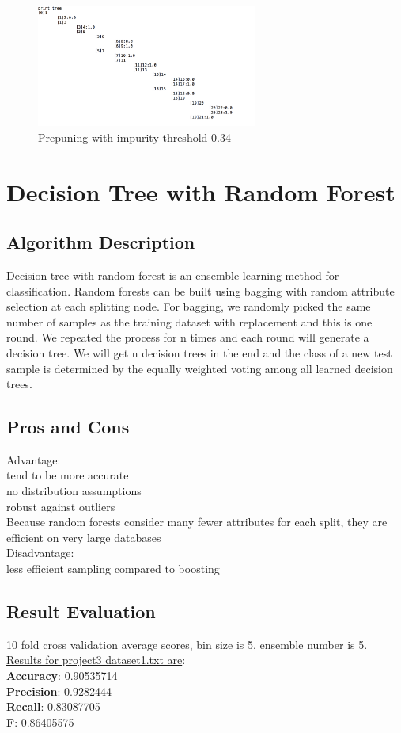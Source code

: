\documentclass[paper=letter, fontsize=11pt]{article}
\numberwithin{equation}{section}		%
\numberwithin{figure}{section}			%
\numberwithin{table}{section}				%
\begin{document}
\begin{figure}[h]
  \centering
  \includegraphics[width=0.8\linewidth,height=4cm]{dataset2_threshold_34.png}
  \caption{Prepuning with impurity threshold 0.34}
\end{figure}


\section{Decision Tree with Random Forest}
\subsection{Algorithm Description}
Decision tree with random forest is an ensemble learning method for classification.
Random forests can be built using bagging with random attribute selection at each
splitting node. For bagging, we randomly picked the same number of samples as the
training dataset with replacement and this is one round. We repeated the process for
n times and each round will generate a decision tree. We will get n decision trees in
the end and the class of a new test sample is determined by the equally weighted
voting among all learned decision trees.
\subsection{Pros and Cons}
Advantage:\\
tend to be more  accurate\\
no distribution assumptions\\
robust against outliers \\
 Because random forests consider many fewer attributes for each split, they are efficient
on very large databases\\
 \noindent Disadvantage:\\
 less efficient sampling compared to boosting\\
 
\subsection{Result Evaluation}
10 fold  cross validation average scores, bin size is 5, ensemble number is 5.
\\
\noindent \underline{ Results for project3 dataset1.txt are}: \\ 
\textbf{Accuracy}: 0.90535714\\
\textbf{Precision}: 0.9282444\\
\textbf{Recall}: 0.83087705\\
\textbf{F}: 0.86405575\\
\end{document}

